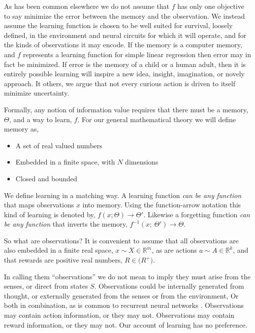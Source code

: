 As has been common elsewhere \cite{Schmidhuber1991,Oudeyer2016,Pathak2017,Gottlieb2018,Wilson2020,Schwartenbeck2019} we do not assume that $f$ has only one objective to say minimize the error between the memory and the observation. We instead assume the learning function is chosen to be well suited for survival, loosely defined, in the environment and neural circuits for which it will operate, and for the kinds of observations it may encode. If the memory is a computer memory, and $f$ represents a learning function for simple linear regression then error may in fact be minimized. If error is the memory of a child or a human adult, then it is entirely possible learning will inspire a new idea, insight, imagination, or novely approach. It others, we argue that not every curious action is driven to itself minimize uncertainty.

Formally, any notion of information value requires that there must be a memory, $\Theta$, and a way to learn, $f$. For our general mathematical theory we will define memory as,

\begin{itemize}
\item A set of real valued numbers
\item Embedded in a finite space, with $N$ dimensions 
\item Closed and bounded
\end{itemize}

We define learning in a matching way. A learning function \textit{can be any function} that maps observations $x$ into memory. Using the function-arrow notation this kind of learning is denoted by, $f(x;\Theta) \rightarrow \Theta'$. Likewise a forgetting function \textit{can be any function} that inverts the memory, $f^{-1}(x;\ \Theta') \rightarrow \Theta$. 

So what are observations? It is convenient to assume that all observations are also embedded in a finite real space, $x \sim X \in \mathbb{R}^m$, as are actions $a \sim A \in \mathbb{R}^k$, and that rewards are positive real numbers, $R \in \mathbb(R^{+})$. 

In calling them ``observations'' we do not mean to imply they must arise from the senses, or direct from states $S$. Observations could be internally generated from thought, or externally generated from the senses or from the environment, Or both in combination, as is common to recurrent neural networks . Observations may contain action information, or they may not. Observations may contain reward information, or they may not. Our account of learning has no preference.

